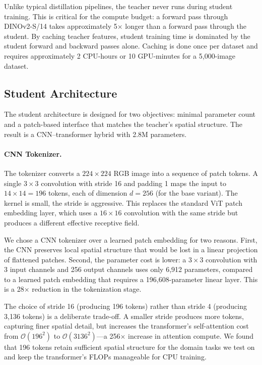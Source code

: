 \documentclass{article}
\begin{document}
Unlike typical distillation pipelines, the teacher never runs during student training. This is critical for the compute budget: a forward pass through DINOv2-S/14 takes approximately 5$\times$ longer than a forward pass through the student. By caching teacher features, student training time is dominated by the student forward and backward passes alone. Caching is done once per dataset and requires approximately 2 CPU-hours or 10 GPU-minutes for a 5,000-image dataset.

\subsection{Student Architecture}

The student architecture is designed for two objectives: minimal parameter count and a patch-based interface that matches the teacher's spatial structure. The result is a CNN--transformer hybrid with 2.8M parameters.

\paragraph{CNN Tokenizer.}
The tokenizer converts a $224 \times 224$ RGB image into a sequence of patch tokens. A single $3\times3$ convolution with stride 16 and padding 1 maps the input to $14 \times 14 = 196$ tokens, each of dimension $d=256$ (for the base variant). The kernel is small, the stride is aggressive. This replaces the standard ViT patch embedding layer, which uses a $16\times16$ convolution with the same stride but produces a different effective receptive field.

We chose a CNN tokenizer over a learned patch embedding for two reasons. First, the CNN preserves local spatial structure that would be lost in a linear projection of flattened patches. Second, the parameter cost is lower: a $3\times3$ convolution with 3 input channels and 256 output channels uses only 6,912 parameters, compared to a learned patch embedding that requires a 196,608-parameter linear layer. This is a 28$\times$ reduction in the tokenization stage.

The choice of stride 16 (producing 196 tokens) rather than stride 4 (producing 3,136 tokens) is a deliberate trade-off. A smaller stride produces more tokens, capturing finer spatial detail, but increases the transformer's self-attention cost from $\mathcal{O}(196^2)$ to $\mathcal{O}(3136^2)$---a 256$\times$ increase in attention compute. We found that 196 tokens retain sufficient spatial structure for the domain tasks we test on and keep the transformer's FLOPs manageable for CPU training.
\end{document}
